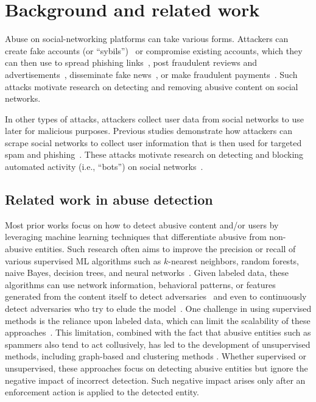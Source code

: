 \section{Background and related work}
\label{sec:background}


Abuse on social-networking platforms can take various forms. Attackers can create fake accounts (or ``sybils'')~\cite{xiao2015detecting,gong2014sybilbelief,danezis2009sybilinfer,clickstream,uncovering_social} or compromise existing accounts, which they can then use to spread phishing links~\cite{gao2010detecting, grier2010spam}, post fraudulent reviews and advertisements~\cite{al2021spam}, disseminate fake news~\cite{elazab2018fraud}, or make fraudulent payments~\cite{caldeira2014fraud}. Such attacks motivate research on detecting and removing abusive content on social networks. 

In other types of attacks, attackers collect user data from social networks to use later for malicious purposes. Previous studies demonstrate how attackers can scrape social networks to collect user information that is then used for targeted spam and phishing~\cite{balduzzi2010abusing,jagatic2007social,brown2008social}. These attacks motivate research on detecting and blocking automated activity (i.e., ``bots'') on social networks~\cite{orabi2020detection}.

\subsection{Related work in abuse detection}
\label{sec:related_abuse}

Most prior works focus on how to detect abusive content and/or users by leveraging machine learning techniques that differentiate abusive from non-abusive entities. Such research often aims to improve the precision or recall of various supervised ML algorithms such as $k$-nearest neighbors, random forests, naive Bayes, decision trees, and neural networks~\cite{al2021spam,elazab2018fraud,caldeira2014fraud,acm2010,ceas2010,LCAI2011}. Given labeled data, these algorithms can use network information, behavioral patterns, or features generated from the content itself to detect adversaries~\cite{IEEE2016} and even to continuously detect adversaries who try to elude the model~\cite{KDD2004}. One challenge in using supervised methods is the reliance upon labeled data, which can limit the scalability of these approaches~\cite{IEEE2016}. This limitation, combined with the fact that abusive entities such as spammers also tend to act collusively, has led to the development of unsupervised methods, including graph-based and clustering methods \cite{WWW2013,ACM2014,WWW2016,IEEE2016}. Whether supervised or unsupervised, these approaches focus on detecting abusive entities but ignore the negative impact of incorrect detection. Such negative impact arises only after an enforcement action is applied to the detected entity.

